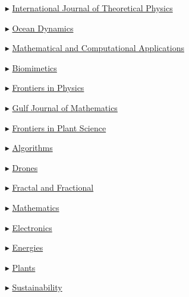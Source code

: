 \begin{itemize}
    \item[$\blacktriangleright$] \href{https://link.springer.com/journal/10773/}{International Journal of Theoretical Physics}

    \item[$\blacktriangleright$] \href{https://link.springer.com/journal/10236/}{Ocean Dynamics}
    
    \item[$\blacktriangleright$] \href{https://www.mdpi.com/journal/mca/}{Mathematical and Computational Applications}

    \item[$\blacktriangleright$] \href{https://www.mdpi.com/journal/biomimetics/}{Biomimetics}

    \item[$\blacktriangleright$] \href{https://www.frontiersin.org/journals/physics/}{Frontiers in Physics}

    \item[$\blacktriangleright$] \href{https://gjom.org/}{Gulf Journal of Mathematics}

    \item[$\blacktriangleright$] \href{https://www.frontiersin.org/journals/plant-science/}{
Frontiers in Plant Science}

    \item[$\blacktriangleright$] \href{https://www.mdpi.com/journal/algorithms/}{Algorithms}

    \item[$\blacktriangleright$] \href{https://www.mdpi.com/journal/drones/}{Drones}

    \item[$\blacktriangleright$] \href{https://www.mdpi.com/journal/fractalfract/}{Fractal and Fractional}

    \item[$\blacktriangleright$] \href{https://www.mdpi.com/journal/mathematics/}{Mathematics}

    \item[$\blacktriangleright$] \href{https://www.mdpi.com/journal/electronics/}{Electronics}

    \item[$\blacktriangleright$] \href{https://www.mdpi.com/journal/energies/}{Energies}

    \item[$\blacktriangleright$] \href{https://www.mdpi.com/journal/plants/}{Plants}

    \item[$\blacktriangleright$] \href{https://www.mdpi.com/journal/sustainability/}{Sustainability}


\end{itemize}
